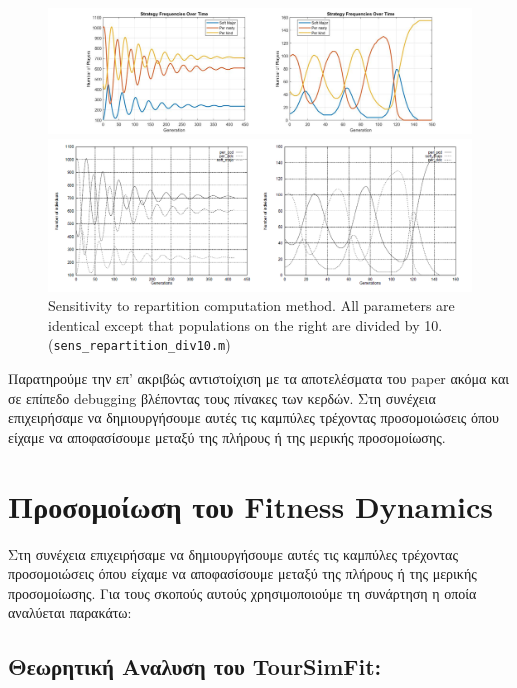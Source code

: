 \begin{figure}[ht!]
	\centering
	\begin{minipage}{1\textwidth}
		\includegraphics[width=1\linewidth]{fit_plots_theoretical/repartition_div10}
		
		
	\end{minipage}
	\begin{minipage}{1\textwidth}
		\includegraphics[width=1\linewidth]{sens_div10}
	\end{minipage}
	\caption{Sensitivity to repartition computation method. All parameters are identical
		except that populations on the right are divided by 10. (\texttt{sens\_repartition\_div10.m})}
\end{figure}


\clearpage

Παρατηρούμε την επ’ ακριβώς αντιστοίχιση με τα αποτελέσματα του paper ακόμα και σε επίπεδο debugging βλέποντας τους πίνακες των κερδών.
Στη συνέχεια επιχειρήσαμε να δημιουργήσουμε αυτές τις καμπύλες τρέχοντας προσομοιώσεις όπου είχαμε να αποφασίσουμε μεταξύ της πλήρους ή της μερικής προσομοίωσης.

\section{Προσομοίωση του Fitness Dynamics}
Στη συνέχεια επιχειρήσαμε να δημιουργήσουμε αυτές τις καμπύλες τρέχοντας προσομοιώσεις όπου είχαμε να αποφασίσουμε μεταξύ της πλήρους ή της μερικής προσομοίωσης.
Για τους σκοπούς αυτούς χρησιμοποιούμε τη συνάρτηση  η οποία αναλύεται παρακάτω:
\subsection{Θεωρητική Αναλυση του TourSimFit:
}




